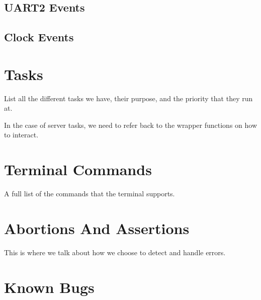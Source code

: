 \documentclass[pdftex,10pt,a4paper]{article}
\begin{document}
\subsection*{UART2 Events}
\subsection*{Clock Events}

\section*{Tasks}

List all the different tasks we have, their purpose, and the priority
that they run at.

In the case of server tasks, we need to refer back to the wrapper
functions on how to interact.

\section*{Terminal Commands}

A full list of the commands that the terminal supports.

\section*{Abortions And Assertions}

This is where we talk about how we choose to detect and handle errors.

\section*{Known Bugs}
\end{document}

